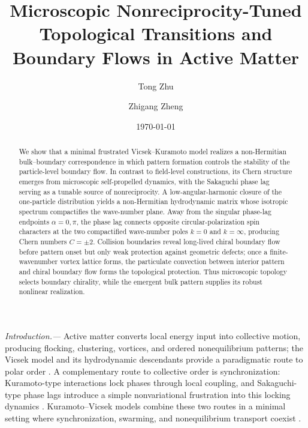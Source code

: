 \documentclass[aps,prl,reprint,superscriptaddress,nofootinbib,floatfix]{revtex4-2}
\begin{document}
\title{Microscopic Nonreciprocity-Tuned Topological Transitions and Boundary Flows in Active Matter}

\author{Tong Zhu}
\author{Zhigang Zheng}
\date{\today}

\begin{abstract}
We show that a minimal frustrated Vicsek--Kuramoto model realizes a non-Hermitian bulk--boundary correspondence in which pattern formation controls the stability of the particle-level boundary flow. In contrast to field-level constructions, its Chern structure emerges from microscopic self-propelled dynamics, with the Sakaguchi phase lag serving as a tunable source of nonreciprocity. A low-angular-harmonic closure of the one-particle distribution yields a non-Hermitian hydrodynamic matrix whose isotropic spectrum compactifies the wave-number plane. Away from the singular phase-lag endpoints $\alpha=0,\pi$, the phase lag connects opposite circular-polarization spin characters at the two compactified wave-number poles $k=0$ and $k=\infty$, producing Chern numbers $C=\pm2$. Collision boundaries reveal long-lived chiral boundary flow before pattern onset but only weak protection against geometric defects; once a finite-wavenumber vortex lattice forms, the particulate convection between interior pattern and chiral boundary flow forms the topological protection. Thus microscopic topology selects boundary chirality, while the emergent bulk pattern supplies its robust nonlinear realization.
\end{abstract}

\maketitle

\emph{Introduction.---}
Active matter converts local energy input into collective motion, producing flocking, clustering, vortices, and ordered nonequilibrium patterns; the Vicsek model and its hydrodynamic descendants provide a paradigmatic route to polar order \cite{Ramaswamy2010,Marchetti2013,Vicsek1995,TonerTu1995}. A complementary route to collective order is synchronization: Kuramoto-type interactions lock phases through local coupling, and Sakaguchi-type phase lags introduce a simple nonvariational frustration into this locking dynamics \cite{Kuramoto1984,Strogatz2000,Acebron2005,Sakaguchi1988}. Kuramoto--Vicsek models combine these two routes in a minimal setting where synchronization, swarming, and nonequilibrium transport coexist \cite{Degond2013KuramotoVicsek,Chate2015Memory,LiebchenLevis2017}.
\end{document}
